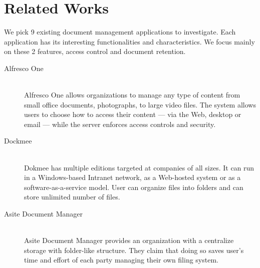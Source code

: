 \section{Related Works} \label{relate-works}
We pick 9 existing document management applications to investigate.
Each application has its interesting functionalities and characteristics.
We focus mainly on these 2 features, access control and document retention.
\begin{description}
\item[Alfresco One] \hfill \\
Alfresco One allows organizations to manage any type of content from small office documents, photographs, to large video files.
The system allows users to choose how to access their content --- via the Web, desktop or email --- while the server enforces access controls and security.

\item[Dockmee] \hfill \\
Dokmee has multiple editions targeted at companies of all sizes.
It can run in a Windows-based Intranet network, as a Web-hosted system or as a software-as-a-service model.
User can organize files into folders and can store unlimited number of files.

\item[Asite Document Manager] \hfill \\
Asite Document Manager provides an organization with a centralize storage with folder-like structure.
They claim that doing so saves user's time and effort of each party managing their own filing system.
\end{description}